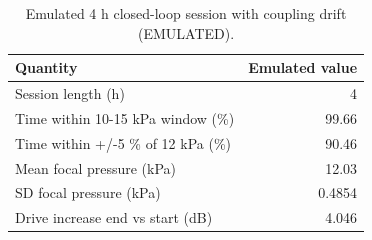 \begin{table}
\caption{Emulated 4 h closed-loop session with coupling drift (EMULATED).}
\label{tab:T_E5_session}
\begin{tabular}{lr}
\toprule
Quantity & Emulated value \\
\midrule
Session length (h) & 4 \\
Time within 10-15 kPa window (\%) & 99.66 \\
Time within +/-5 \% of 12 kPa (\%) & 90.46 \\
Mean focal pressure (kPa) & 12.03 \\
SD focal pressure (kPa) & 0.4854 \\
Drive increase end vs start (dB) & 4.046 \\
\bottomrule
\end{tabular}
\end{table}
